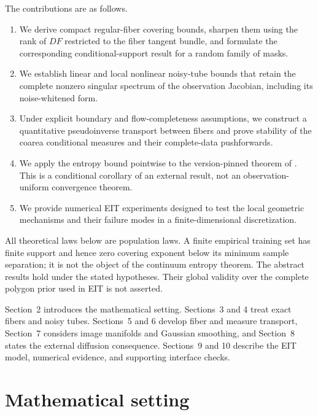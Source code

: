 \documentclass[11pt]{article}
\theoremstyle{definition}
\begin{document}
The contributions are as follows.
\begin{enumerate}
 \item We derive compact regular-fiber covering bounds, sharpen them using the
 rank of $DF$ restricted to the fiber tangent bundle, and formulate the
 corresponding conditional-support result for a random family of masks.
 \item We establish linear and local nonlinear noisy-tube bounds that retain
 the complete nonzero singular spectrum of the observation Jacobian, including
 its noise-whitened form.
 \item Under explicit boundary and flow-completeness assumptions, we construct
 a quantitative pseudoinverse transport between fibers and prove stability of
 the coarea conditional measures and their complete-data pushforwards.
 \item We apply the entropy bound pointwise to the version-pinned theorem of
 \citet[arXiv version 2]{liang2025lowdim}.  This is a conditional corollary of
 an external result, not an observation-uniform convergence theorem.
 \item We provide numerical EIT experiments designed to test the local
 geometric mechanisms and their failure modes in a finite-dimensional
 discretization.
\end{enumerate}

All theoretical laws below are population laws.  A finite empirical training
set has finite support and hence zero covering exponent below its minimum
sample separation; it is not the object of the continuum entropy theorem.
The abstract results hold under the stated hypotheses.  Their global validity
over the complete polygon prior used in EIT is not asserted.

Section~2 introduces the mathematical setting.  Sections~3 and 4 treat exact
fibers and noisy tubes.  Sections~5 and 6 develop fiber and measure transport,
Section~7 considers image manifolds and Gaussian smoothing, and Section~8
states the external diffusion consequence.  Sections~9 and 10 describe the EIT
model, numerical evidence, and supporting interface checks.

\section{Mathematical setting}
\end{document}
